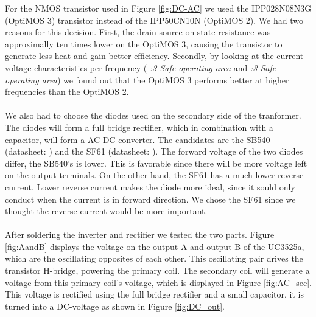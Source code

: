\documentclass[final]{scrreprt} %
\begin{document}
For the NMOS transistor used in Figure \ref{fig:DC-AC} we used the IPP028N08N3G (OptiMOS 3) transistor instead of the IPP50CN10N (OptiMOS 2).
We had two reasons for this decision.
First, the drain-source on-state resistance was approximally ten times lower on the OptiMOS 3, causing the transistor to generate less heat and gain better efficiency.
Secondly, by looking at the current-voltage characteristics per frequency (\cite{OptiMOS2} \emph{:3 Safe operating area} and \cite{OptiMOS3} \emph{:3 Safe operating area}) we found out that the OptiMOS 3 performs better at higher frequencies than the OptiMOS 2.
\\ \\
We also had to choose the diodes used on the secondary side of the tranformer. The diodes will form a full bridge rectifier, which in combination with a capacitor, will form a AC-DC converter.
The candidates are the SB540 (datasheet: \cite{SB540}) and the SF61 (datasheet: \cite{SF61}).
The forward voltage of the two diodes differ, the SB540's is lower. This is favorable since there will be more voltage left on the output terminals.
On the other hand, the SF61 has a much lower reverse current. Lower reverse current makes the diode more ideal, since it sould only conduct when the current is in forward direction.
We chose the SF61 since we thought the reverse current would be more important.
\\ \\
After soldering the inverter and rectifier we tested the two parts.
Figure \ref{fig:AandB} displays the voltage on the output-A and output-B of the UC3525a, which are the oscillating opposites of each other.
This oscillating pair drives the transistor H-bridge, powering the primary coil.
The secondary coil will generate a voltage from this primary coil's voltage, which is displayed in Figure \ref{fig:AC_sec}.
This voltage is rectified using the full bridge rectifier and a small capacitor, it is turned into a DC-voltage as shown in Figure \ref{fig:DC_out}.
\end{document}
